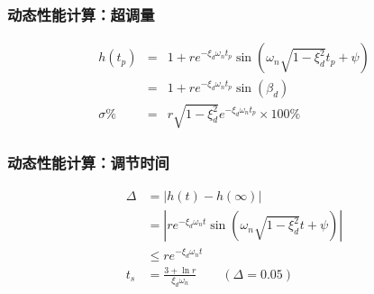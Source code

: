 \documentclass{beamer}
\begin{document}
\begin{frame}
\frametitle{动态性能计算：超调量}
\label{sec-2-6}

\begin{eqnarray*}
h(t_p) & =& 1+re^{-\xi_d\omega_n t_p}\sin(\omega_n\sqrt{1-\xi_d^2}t_p+\psi) \\
 &=& 1+re^{-\xi_d\omega_n t_p}\sin(\beta_d) \\
\sigma\% &=& r\sqrt{1-\xi_d^2}e^{-\xi_d\omega_n t_p} \times 100\%
\end{eqnarray*}
\end{frame}
\begin{frame}
\frametitle{动态性能计算：调节时间}
\label{sec-2-7}

\begin{align*}
\Delta  &= |h(t)-h(\infty)|\\
&= |re^{-\xi_d\omega_n t}\sin(\omega_n\sqrt{1-\xi_d^2}t+\psi) |\\
&\leqslant re^{-\xi_d\omega_n t} \\
t_s &= \frac{3+\ln r}{\xi_d \omega_n}\qquad (\Delta=0.05)
\end{align*}
\end{frame}
\end{document}
